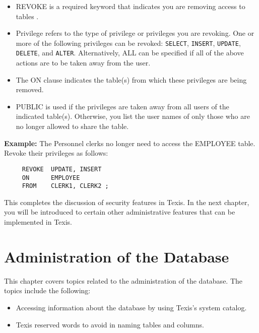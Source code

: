 \begin{itemize}
\item REVOKE is a required keyword that indicates you are removing
access to tables
.

\item Privilege refers to the type of privilege or privileges you are
revoking.  One or more of the following privileges can be revoked:
\verb`SELECT`, \verb`INSERT`, \verb`UPDATE`, \verb`DELETE`, and \verb`ALTER`.  Alternatively, ALL can be
specified if all of the above actions are to be taken away from the
user.

\item The ON clause indicates the table(s)
from which these
privileges are being removed.

\item PUBLIC is used if the privileges are taken away from all users
of the indicated table(s).  Otherwise, you list the user names of only
those who are no longer allowed to share the table.
\end{itemize}

{\bf Example:}
The Personnel clerks no longer need to access the EMPLOYEE table.
Revoke their privileges as follows:

\begin{verbatim}
     REVOKE  UPDATE, INSERT
     ON      EMPLOYEE
     FROM    CLERK1, CLERK2 ;
\end{verbatim}

This completes the discussion of security features in Texis.  In the
next chapter, you will be introduced to certain other administrative
features that can be implemented in Texis.

\chapter{Administration of the Database}{\label{chp:AdmDB}}

This chapter covers topics related to the administration of the
database.  The topics include the following:

\begin{itemize}
\item Accessing information about the database by using Texis's system
catalog.


\item Texis reserved words to avoid in naming tables and columns.
\end{itemize}

